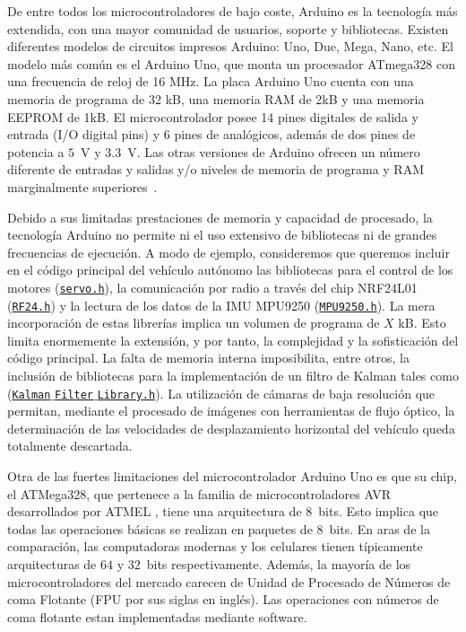 \documentclass[a4paper,12pt]{book}
\begin{document}
De entre todos los microcontroladores de bajo coste, Arduino es la tecnología más extendida, con una mayor comunidad de usuarios, soporte y bibliotecas. Existen diferentes modelos de circuitos impresos Arduino: Uno, Due, Mega, Nano, etc. El modelo más común es el Arduino Uno, que monta un procesador ATmega328 con una frecuencia de reloj de 16 MHz. La placa Arduino Uno cuenta con una memoria de programa de 32 kB, una memoria RAM de 2kB y una memoria EEPROM de 1kB. El microcontrolador posee 14 pines digitales de salida y entrada (I/O digital pins) y 6 pines de analógicos, además de dos pines de potencia a $5$~V y $3.3$~V. Las otras versiones de Arduino ofrecen un número diferente de entradas y salidas y/o niveles de memoria de programa y RAM marginalmente superiores~\cite{kondaveeti2021systematic}.

Debido a sus limitadas prestaciones de memoria y capacidad de procesado, la tecnología Arduino no permite ni el uso extensivo de bibliotecas ni de grandes frecuencias de ejecución. A modo de ejemplo, consideremos que queremos incluir en el código principal del vehículo autónomo las bibliotecas para el control de los motores (\href{https://www.arduino.cc/reference/en/libraries/servo/}{\texttt{servo.h}}), la comunicación por radio a través del chip NRF24L01 (\href{https://reference.arduino.cc/reference/en/libraries/rf24/}{\texttt{RF24.h}}) y la lectura de los datos de la IMU MPU9250 (\href{https://reference.arduino.cc/reference/en/libraries/mpu9250/}{\texttt{MPU9250.h}}). La mera incorporación de estas librerías implica un volumen de programa de {\color{red}$X$ kB}. Esto limita enormemente la extensión, y por tanto, la complejidad y la sofisticación del código principal. La falta de memoria interna imposibilita, entre otros, la inclusión de bibliotecas para la implementación de un filtro de Kalman tales como (\href{https://reference.arduino.cc/reference/en/libraries/kalman-filter-library/}{\texttt{Kalman$\_$Filter$\_$Library.h}}). La utilización de cámaras de baja resolución que permitan, mediante el procesado de imágenes con herramientas de flujo óptico, la determinación de las velocidades de desplazamiento horizontal del vehículo queda totalmente descartada.

Otra de las fuertes limitaciones del microcontrolador Arduino Uno es que su chip, el ATMega328, que pertenece a la familia de microcontroladores AVR desarrollados por ATMEL \cite{kunikowski2015overview}, tiene una arquitectura de $8$~bits. Esto implica que todas las operaciones básicas se realizan en paquetes de $8$~bits. En aras de la comparación, las computadoras modernas y los celulares tienen típicamente arquitecturas de $64$ y $32$~bits respectivamente. Además, la mayoría de los microcontroladores del mercado carecen de Unidad de Procesado de Números de coma Flotante (FPU por sus siglas en inglés). Las operaciones con números de coma flotante estan implementadas mediante software.
\end{document}
